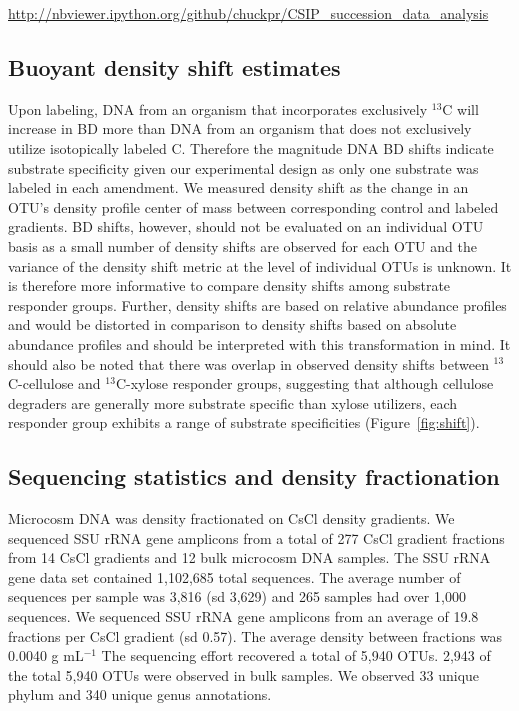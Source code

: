 \url{http://nbviewer.ipython.org/github/chuckpr/CSIP_succession_data_analysis}

\subsection{Buoyant density shift estimates}\label{BD}
Upon labeling, DNA from an organism that incorporates exclusively $^{13}$C will
increase in BD more than DNA from an organism that does not exclusively utilize
isotopically labeled C. Therefore the magnitude DNA BD shifts indicate
substrate specificity given our experimental design as only one substrate was
labeled in each amendment. We measured density shift as the change in an OTU's
density profile center of mass between corresponding control and labeled
gradients. BD shifts, however, should not be evaluated on an individual OTU
basis as a small number of density shifts are observed for each OTU and the
variance of the density shift metric at the level of individual OTUs is
unknown. It is therefore more informative to compare density shifts among
substrate responder groups. Further, density shifts are based on relative
abundance profiles and would be distorted in comparison to density shifts based
on absolute abundance profiles and should be interpreted with this
transformation in mind. It should also be noted that there was overlap in
observed density shifts between $^{13}$C-cellulose and $^{13}$C-xylose
responder groups, suggesting that although cellulose degraders are generally
more substrate specific than xylose utilizers, each responder group
exhibits a range of substrate specificities (Figure~\ref{fig:shift}). 

\subsection{Sequencing statistics and density fractionation}\label{seq_stats}
Microcosm DNA was density fractionated on CsCl density gradients. We sequenced
SSU rRNA gene amplicons from a total of 277 CsCl gradient fractions from 14
CsCl gradients and 12 bulk microcosm DNA samples. The SSU rRNA gene data set
contained 1,102,685 total sequences. The average number of sequences per sample
was 3,816 (sd 3,629) and 265 samples had over 1,000 sequences. We sequenced SSU
rRNA gene amplicons from an average of
19.8 fractions per CsCl gradient (sd 0.57). The average density between
fractions was  0.0040 g mL$^{-1}$ The sequencing effort recovered a total of
5,940 OTUs. 2,943 of the total 5,940 OTUs were observed in bulk samples. We
observed 33 unique phylum and 340 unique genus annotations.

